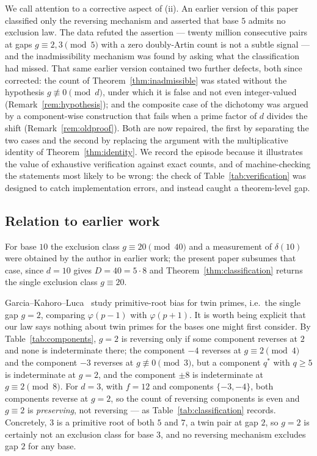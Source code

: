 \documentclass[11pt,reqno]{amsart}
\theoremstyle{plain}
\theoremstyle{definition}
\begin{document}
We call attention to a corrective aspect of (ii). An earlier version of this
paper classified only the reversing mechanism and asserted that base $5$
admits no exclusion law. The data refuted the assertion --- twenty million
consecutive pairs at gaps $g \equiv 2, 3 \pmod 5$ with a zero doubly-Artin
count is not a subtle signal --- and the inadmissibility mechanism was found
by asking what the classification had missed. That same earlier version
contained two further defects, both since corrected: the count of
Theorem~\ref{thm:inadmissible} was stated without the hypothesis
$g \not\equiv 0 \pmod d$, under which it is false and not even
integer-valued (Remark~\ref{rem:hypothesis}); and the composite case of the
dichotomy was argued by a component-wise construction that fails when a prime
factor of $d$ divides the shift (Remark~\ref{rem:oldproof}). Both are now
repaired, the first by separating the two cases and the second by replacing
the argument with the multiplicative identity of Theorem~\ref{thm:identity}.
We record the episode because it illustrates the value of exhaustive
verification against exact counts, and of machine-checking the statements most
likely to be wrong: the check of Table~\ref{tab:verification} was designed to
catch implementation errors, and instead caught a theorem-level gap.

\subsection*{Relation to earlier work}
For base $10$ the exclusion class $g \equiv 20 \pmod{40}$ and a measurement of
$\delta(10)$ were obtained by the author in earlier work; the present paper
subsumes that case, since $d = 10$ gives $D = 40 = 5 \cdot 8$ and
Theorem~\ref{thm:classification} returns the single exclusion class
$g \equiv 20$.

Garcia--Kahoro--Luca~\cite{GarciaKahoroLuca2019} study primitive-root bias for
twin primes, i.e.\ the single gap $g = 2$, comparing $\varphi(p-1)$ with
$\varphi(p+1)$. It is worth being explicit that our law says nothing about
twin primes for the bases one might first consider. By
Table~\ref{tab:components}, $g = 2$ is reversing only if some component
reverses at $2$ and none is indeterminate there; the component $-4$ reverses
at $g \equiv 2 \pmod 4$ and the component $-3$ reverses at $g \not\equiv 0
\pmod 3$, but a component $q^*$ with $q \ge 5$ is indeterminate at $g = 2$,
and the component $\pm 8$ is indeterminate at $g \equiv 2 \pmod 8$. For
$d = 3$, with $f = 12$ and components $\{-3, -4\}$, both components reverse at
$g = 2$, so the count of reversing components is even and $g \equiv 2$ is
\emph{preserving}, not reversing --- as Table~\ref{tab:classification} records.
Concretely, $3$ is a primitive root of both $5$ and $7$, a twin pair at gap
$2$, so $g = 2$ is certainly not an exclusion class for base $3$, and no
reversing mechanism excludes gap $2$ for any base.
\end{document}
